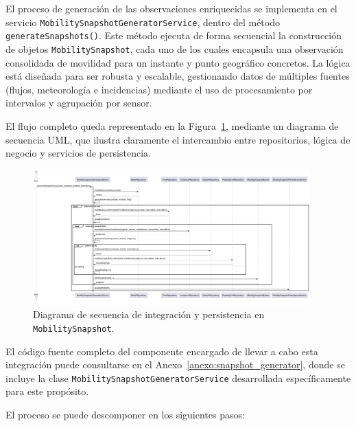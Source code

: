 El proceso de generación de las observaciones enriquecidas se implementa en el servicio \texttt{MobilitySnapshotGeneratorService}, dentro del método \texttt{generateSnapshots()}. Este método ejecuta de forma secuencial la construcción de objetos \texttt{MobilitySnapshot}, cada uno de los cuales encapsula una observación consolidada de movilidad para un instante y punto geográfico concretos. La lógica está diseñada para ser robusta y escalable, gestionando datos de múltiples fuentes (flujos, meteorología e incidencias) mediante el uso de procesamiento por intervalos y agrupación por sensor.

El flujo completo queda representado en la Figura~\ref{fig:sequence_mobility_snapshot}, mediante un diagrama de secuencia UML, que ilustra claramente el intercambio entre repositorios, lógica de negocio y servicios de persistencia.

\begin{figure}[H]
	\centering
	\includegraphics[width=0.95\textwidth]{includes/snapshot_generator_sequence.png}
	\caption{Diagrama de secuencia de integración y persistencia en \texttt{MobilitySnapshot}.}
	\label{fig:sequence_mobility_snapshot}
\end{figure}

El código fuente completo del componente encargado de llevar a cabo esta integración puede consultarse en el Anexo~\ref{anexo:snapshot_generator}, donde se incluye la clase \texttt{MobilitySnapshotGeneratorService} desarrollada específicamente para este propósito.

El proceso se puede descomponer en los siguientes pasos:

